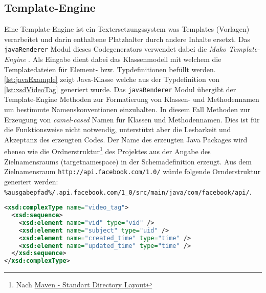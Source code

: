 \subsection{Template-Engine}
\label{sec:template}

Eine Template-Engine ist ein Textersetzungssystem was Templates (Vorlagen) verarbeitet und darin enthaltene Platzhalter durch andere Inhalte ersetzt. Das \texttt{javaRenderer} Modul dieses Codegenerators verwendet dabei die \emph{Mako Template-Engine} \cite{mako}. Als Eingabe dient dabei das Klassenmodell mit welchem die Templatedateien für Element- bzw. Typdefinitionen befüllt werden. \cref{lst:javaExample} zeigt Java-Klasse welche aus der Typdefinition von \cref{lst:xsdVideoTag} generiert wurde. Das \texttt{javaRenderer} Modul übergibt der Template-Engine Methoden zur Formatierung von Klassen- und Methodennamen um bestimmte Namenskonventionen einzuhalten. In diesem Fall Methoden zur Erzeugung von \emph{camel-cased} Namen für Klassen und Methodennamen. Dies ist für die Funktionsweise nicht notwendig, unterstützt aber die Lesbarkeit und Akzeptanz des erzeugten Codes.
Der Name des erzeugten Java Packages wird ebenso wie die Ordnerstruktur\footnote{Nach \href{http://maven.apache.org/guides/introduction/introduction-to-the-standard-directory-layout.html}{Maven - Standart Directory Layout}} des Projektes aus der Angabe des Zielnamensraums (targetnamespace) in der Schemadefinition erzeugt. Aus dem Zielnamensraum \texttt{http://api.facebook.com/1.0/} würde folgende Ornderstruktur generiert werden: \\
\texttt{\%ausgabepfad\%/.api.facebook.com/1\_0/src/main/java/com/facebook/api/}.

\begin{lstlisting}[language=XML, label=lst:xsdVideoTag, caption=Beispiel für eine XSD Typdefinition aus \cite{facebookXSD}]
<xsd:complexType name="video_tag">
  <xsd:sequence>
    <xsd:element name="vid" type="vid" />
    <xsd:element name="subject" type="uid" />
    <xsd:element name="created_time" type="time" />
    <xsd:element name="updated_time" type="time" />
  </xsd:sequence>
</xsd:complexType>
\end{lstlisting}

